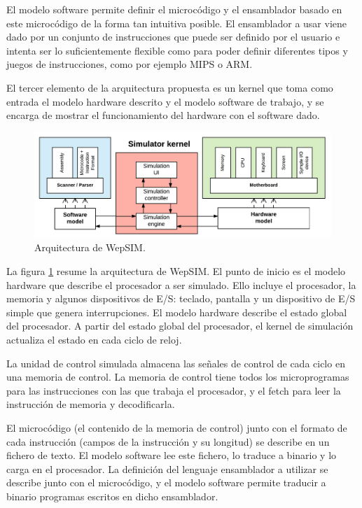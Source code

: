 El modelo software permite definir el microcódigo y el ensamblador basado en este microcódigo de la forma tan intuitiva posible. El ensamblador a usar viene dado por un conjunto de instrucciones que puede ser definido por el usuario e intenta ser lo suficientemente flexible como para poder definir diferentes tipos y juegos de instrucciones, como por ejemplo MIPS o ARM.

El tercer elemento de la arquitectura propuesta es un kernel que toma como entrada el modelo hardware descrito y el modelo software de trabajo, y se encarga de mostrar el funcionamiento del hardware con el software dado.

\begin{figure}[htbp]
 	\centering
 	\includegraphics[width=14cm]{figures/architecture_diagram}
 	\caption{Arquitectura de WepSIM.}
	\label{fig:architecture_diagram}
\end{figure}

La figura \ref{fig:architecture_diagram} resume la arquitectura de WepSIM. El punto de inicio es el modelo hardware que describe el procesador a ser simulado. Ello incluye el procesador, la memoria y algunos dispositivos de E/S: teclado, pantalla y un dispositivo de E/S simple que genera interrupciones. El modelo hardware describe el estado global del procesador. A partir del estado global del procesador, el kernel de simulación actualiza el estado en cada ciclo de reloj.

La unidad de control simulada almacena las señales de control de cada ciclo en una memoria de control. La memoria de control tiene todos los microprogramas para las instrucciones con las que trabaja el procesador, y el fetch para leer la instrucción de memoria y decodificarla.


El microcódigo (el contenido de la memoria de control) junto con el formato de cada instrucción (campos de la instrucción y su longitud) se describe en un fichero de texto. El modelo software lee este fichero, lo traduce a binario y lo carga en el procesador. La definición del lenguaje ensamblador a utilizar se describe junto con el microcódigo, y el modelo software permite traducir a binario programas escritos en dicho ensamblador.


